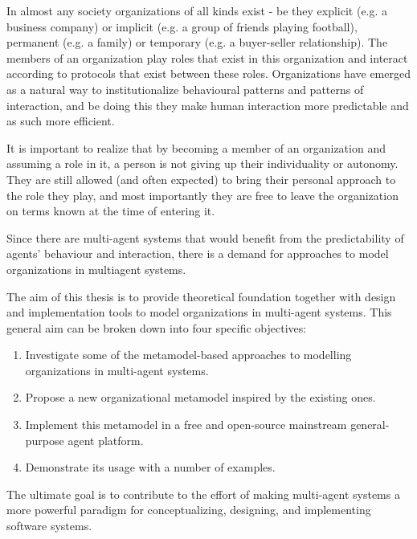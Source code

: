 In almost any society organizations of all kinds exist - be they explicit (e.g. a business company) or implicit (e.g. a group of friends playing football), permanent (e.g. a family) or temporary (e.g. a buyer-seller relationship).
The members of an organization play roles that exist in this organization and interact according to protocols that exist between these roles.
Organizations have emerged as a natural way to institutionalize behavioural patterns and patterns of interaction, and be doing this they make human interaction more predictable and as such more efficient.

It is important to realize that by becoming a member of an organization and assuming a role in it, a person is not giving up their individuality or autonomy.
They are still allowed (and often expected) to bring their personal approach to the role they play, and most importantly they are free to leave the organization on terms known at the time of entering it.

Since there are multi-agent systems that would benefit from the predictability of agents' behaviour and interaction, there is a demand for approaches to model organizations in multiagent systems.


The aim of this thesis is to provide theoretical foundation together with design and implementation tools to model organizations in multi-agent systems.
This general aim can be broken down into four specific objectives:
\begin{enumerate}
	\item Investigate some of the metamodel-based approaches to modelling organizations in multi-agent systems.
	\item Propose a new organizational metamodel inspired by the existing ones.
	\item Implement this metamodel in a free and open-source mainstream general-purpose agent platform.
	\item Demonstrate its usage with a number of examples. 
\end{enumerate}
The ultimate goal is to contribute to the effort of making multi-agent systems a more powerful paradigm for conceptualizing, designing, and implementing software systems.


